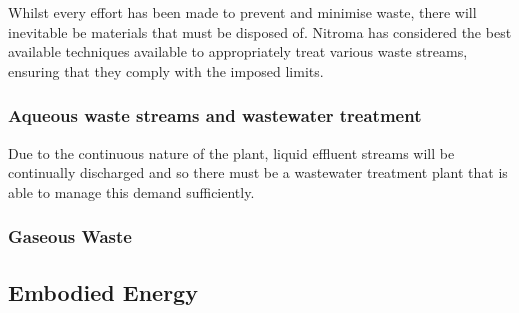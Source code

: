 Whilst every effort has been made to prevent and minimise waste, there will inevitable be materials that must be disposed of. Nitroma has considered the best available techniques available to appropriately treat various waste streams, ensuring that they comply with the imposed limits.  

\subsubsection{Aqueous waste streams and wastewater treatment}

Due to the continuous nature of the plant, liquid effluent streams will be continually discharged and so there must be a wastewater treatment plant that is able to manage this demand sufficiently. 




\subsubsection{Gaseous Waste}

\subsection{Embodied Energy}